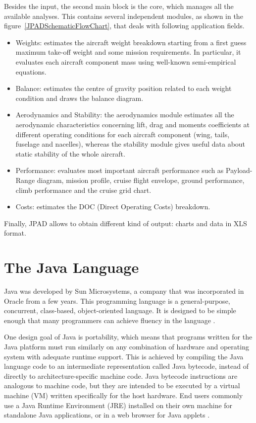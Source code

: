 Besides the input, the second main block is the core, which manages all the available analyses. This contains several independent modules, as shown in the figure~\ref{JPADSchematicFlowChart}, that deals with following application fields.
\begin{itemize}
\item Weights: estimates the aircraft weight breakdown starting from a first guess maximum take-off weight and some mission requirements. In particular, it evaluates each aircraft component mass using well-known semi-empirical equations.
\item Balance: estimates the centre of gravity position related to each weight condition and draws the balance diagram.
\item Aerodynamics and Stability: the aerodynamics module estimates all the aerodynamic characteristics concerning lift, drag and moments coefficients at different operating conditions for each aircraft component (wing, tails, fuselage and nacelles), whereas the stability module gives useful data about static stability of the whole aircraft.
\item Performance: evaluates most important aircraft performance such as Payload-Range diagram, mission profile, cruise flight envelope, ground performance, climb performance and the cruise grid chart.
\item Costs: estimates the DOC (Direct Operating Costs) breakdown.
\end{itemize}

Finally, JPAD allows to obtain different kind of output: charts and data in XLS format.

\section{The Java Language}
\label{sec1.2}

Java was developed by Sun Microsystems, a company that was incorporated in Oracle from a few years. This programming language is a general-purpose, concurrent, class-based, object-oriented language. It is designed to be simple enough that many programmers can achieve fluency in the language \cite{javaoracle}.

One design goal of Java is portability, which means that programs written for the Java platform must run similarly on any combination of hardware and operating system with adequate runtime support. This is achieved by compiling the Java language code to an intermediate representation called Java bytecode, instead of directly to architecture-specific machine code. Java bytecode instructions are analogous to machine code, but they are intended to be executed by a virtual machine (VM) written specifically for the host hardware. End users commonly use a Java Runtime Environment (JRE) installed on their own machine for standalone Java applications, or in a web browser for Java applets \cite{wiki:java}. \\


